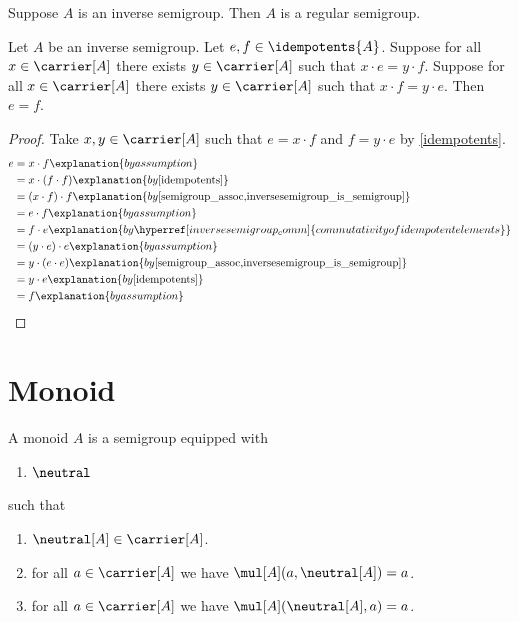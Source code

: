\begin{proposition}\label{inversesemigroup_is_regularsemigroup}
    Suppose $A$ is an inverse semigroup.
    Then $A$ is a regular semigroup.
\end{proposition}

\begin{proposition}\label{idempotentelems_eq_iff_orbits_eq}
    Let $A$ be an inverse semigroup.
    Let $e,f\in\idempotents{A}$.
    Suppose for all $x\in\carrier[A]$ there exists $y\in\carrier[A]$
    such that $x\cdot e = y\cdot f$.
    Suppose for all $x\in\carrier[A]$ there exists $y\in\carrier[A]$
    such that $x\cdot f = y\cdot e$.
    Then $e = f$.
\end{proposition}
\begin{proof}
    Take $x, y\in\carrier[A]$ such that $e = x\cdot f$ and $f = y\cdot e$ by \cref{idempotents}.
    \begin{align*}
        e
            &= x \cdot f
                \explanation{by assumption}\\
            &= x\cdot (f\cdot f)
                \explanation{by \cref{idempotents}}\\
            &= (x\cdot f)\cdot f
                \explanation{by \cref{semigroup_assoc,inversesemigroup_is_semigroup}}\\
            &= e\cdot f
            \explanation{by assumption}\\
            &= f\cdot e
                \explanation{by \hyperref[inversesemigroup_comm]{commutativity of idempotent elements}}\\
            &= (y\cdot e)\cdot e
                \explanation{by assumption}\\
            &= y\cdot (e\cdot e)
                \explanation{by \cref{semigroup_assoc,inversesemigroup_is_semigroup}}\\
            &= y \cdot e
                \explanation{by \cref{idempotents}}\\
            &= f
                \explanation{by assumption}
    \end{align*}
\end{proof}\section{Monoid}\label{form_sec_monoid}

\begin{struct}\label{monoid}
    A monoid $A$ is a semigroup equipped with
    \begin{enumerate}
        \item $\neutral$
    \end{enumerate}
    such that
    \begin{enumerate}
        \item\label{monoid_type} $\neutral[A]\in \carrier[A]$.
        \item\label{monoid_right} for all $a\in \carrier[A]$ we have $\mul[A](a,\neutral[A]) = a$.
        \item\label{monoid_left} for all $a\in \carrier[A]$ we have $\mul[A](\neutral[A], a) = a$.
    \end{enumerate}
\end{struct}

